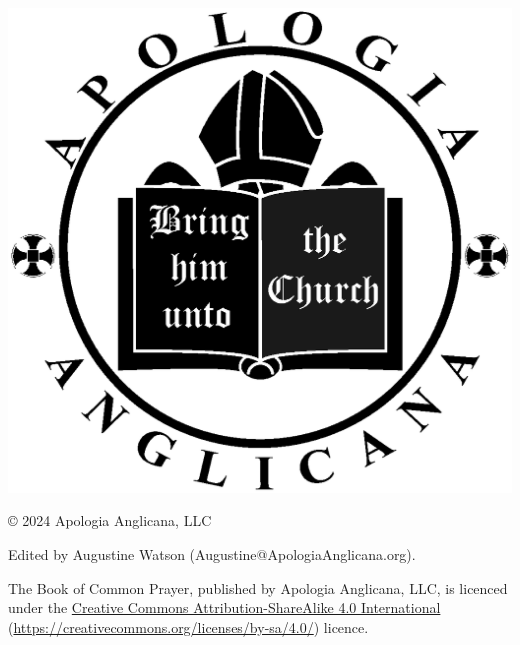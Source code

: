 \documentclass[10pt]{book}
\begin{document}
\begin{titlepage}
\begin{center}
   	        \includegraphics[scale=.17]{logo.eps}
		\end{center}
	\end{titlepage}
\cleardoublepage
{}
\tableofcontents
{}%
\clearpage
\setcounter{page}{1}
\frontmatter
{}
{}
\noindent
\copyright{} 2024 Apologia Anglicana, LLC\\
\par\noindent
Edited by Augustine Watson (Augustine@ApologiaAnglicana.org).\\%
\par\noindent
The Book of Common Prayer, published by Apologia Anglicana, LLC, is licenced under the \href{https://creativecommons.org/licenses/by-sa/4.0/}{Creative Commons Attribution-ShareAlike 4.0 International} (\url{https://creativecommons.org/licenses/by-sa/4.0/}) licence.\\
\par\noindent
\end{document}
